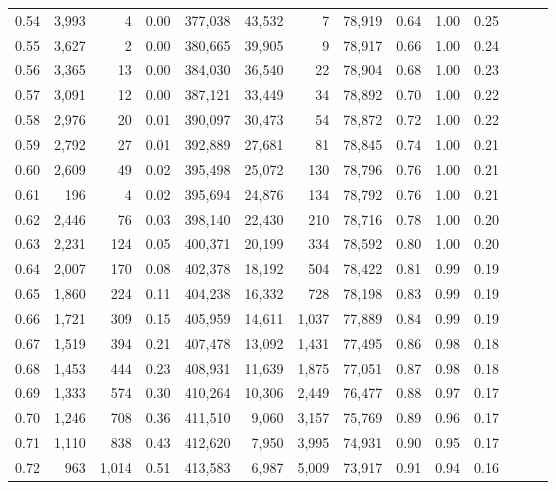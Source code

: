 \begin{tabular}{rrrrrrrrrrrrrr}
0.54 &  3,993 &      4 &  0.00 &  377,038 &   43,532 &       7 &  78,919 &  0.64 &  1.00 &      0.25 \\
0.55 &  3,627 &      2 &  0.00 &  380,665 &   39,905 &       9 &  78,917 &  0.66 &  1.00 &      0.24 \\
0.56 &  3,365 &     13 &  0.00 &  384,030 &   36,540 &      22 &  78,904 &  0.68 &  1.00 &      0.23 \\
0.57 &  3,091 &     12 &  0.00 &  387,121 &   33,449 &      34 &  78,892 &  0.70 &  1.00 &      0.22 \\
0.58 &  2,976 &     20 &  0.01 &  390,097 &   30,473 &      54 &  78,872 &  0.72 &  1.00 &      0.22 \\
0.59 &  2,792 &     27 &  0.01 &  392,889 &   27,681 &      81 &  78,845 &  0.74 &  1.00 &      0.21 \\
0.60 &  2,609 &     49 &  0.02 &  395,498 &   25,072 &     130 &  78,796 &  0.76 &  1.00 &      0.21 \\
0.61 &    196 &      4 &  0.02 &  395,694 &   24,876 &     134 &  78,792 &  0.76 &  1.00 &      0.21 \\
0.62 &  2,446 &     76 &  0.03 &  398,140 &   22,430 &     210 &  78,716 &  0.78 &  1.00 &      0.20 \\
0.63 &  2,231 &    124 &  0.05 &  400,371 &   20,199 &     334 &  78,592 &  0.80 &  1.00 &      0.20 \\
0.64 &  2,007 &    170 &  0.08 &  402,378 &   18,192 &     504 &  78,422 &  0.81 &  0.99 &      0.19 \\
0.65 &  1,860 &    224 &  0.11 &  404,238 &   16,332 &     728 &  78,198 &  0.83 &  0.99 &      0.19 \\
0.66 &  1,721 &    309 &  0.15 &  405,959 &   14,611 &   1,037 &  77,889 &  0.84 &  0.99 &      0.19 \\
0.67 &  1,519 &    394 &  0.21 &  407,478 &   13,092 &   1,431 &  77,495 &  0.86 &  0.98 &      0.18 \\
0.68 &  1,453 &    444 &  0.23 &  408,931 &   11,639 &   1,875 &  77,051 &  0.87 &  0.98 &      0.18 \\
0.69 &  1,333 &    574 &  0.30 &  410,264 &   10,306 &   2,449 &  76,477 &  0.88 &  0.97 &      0.17 \\
0.70 &  1,246 &    708 &  0.36 &  411,510 &    9,060 &   3,157 &  75,769 &  0.89 &  0.96 &      0.17 \\
0.71 &  1,110 &    838 &  0.43 &  412,620 &    7,950 &   3,995 &  74,931 &  0.90 &  0.95 &      0.17 \\
0.72 &    963 &  1,014 &  0.51 &  413,583 &    6,987 &   5,009 &  73,917 &  0.91 &  0.94 &      0.16 \\

\end{tabular}
